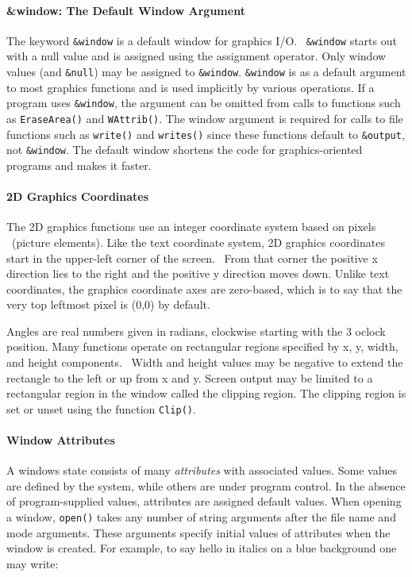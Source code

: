 \paragraph{\&window: The Default Window Argument}

The keyword \texttt{\&window} is a default window for graphics I/O.
\ \texttt{\&window} starts out with a null value and is assigned using
the assignment operator. Only window values (and \texttt{\&null}) may
be assigned to \texttt{\&window}. \texttt{\&window} is as a default
argument to most graphics functions and is used implicitly by various
operations. If a program uses \texttt{\&window}, the argument can be
omitted from calls to functions such as \texttt{EraseArea()} and
\texttt{WAttrib()}. The window argument is required for calls to file
functions such as \texttt{write()} and \texttt{writes()} since these
functions default to \texttt{\&output}, not \texttt{\&window}. The
default window shortens the code for graphics-oriented programs and
makes it faster.

\paragraph{2D Graphics Coordinates}

The 2D graphics functions use an integer coordinate system based on
pixels \ (picture elements). Like the text coordinate system, 2D
graphics coordinates start in the upper-left corner of the screen.
\ From that corner the positive x direction lies to the right and the
positive y direction moves down. Unlike text coordinates, the
graphics coordinate axes are zero-based, which is to say that the very
top leftmost pixel is (0,0) by default.

Angles are real numbers given in radians, clockwise starting with the 3
o{\textquotesingle}clock position. Many functions operate on
rectangular regions specified by x, y, width, and height components.
\ Width and height values may be negative to extend the rectangle to
the left or up from x and y. Screen output may be limited to a
rectangular region in the window called the clipping region. The
clipping region is set or unset using the function \texttt{Clip()}.

\paragraph{Window Attributes}
A window{\textquotesingle}s state consists of many \textit{attributes}
with associated values. Some values are defined by the system, while
others are under program control. In the absence of program-supplied
values, attributes are assigned default values. When opening a window,
\texttt{open()} takes any number of string arguments after the file
name and mode arguments. These arguments specify initial values of
attributes when the window is created. For example, to say hello in
italics on a blue background one may write:

